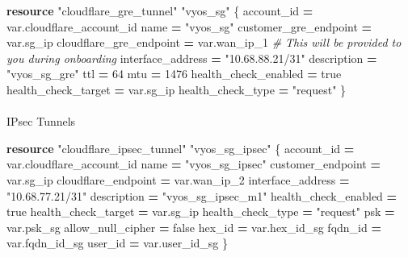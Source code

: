 \documentclass[
]{article}
\makeatletter
\let\oldparagraph\paragraph
\renewcommand{\paragraph}{
    \@ifstar
      \xxxParagraphStar
      \xxxParagraphNoStar
  }
\newcommand{\xxxParagraphStar}[1]{\oldparagraph*{#1}\mbox{}}
\newcommand{\xxxParagraphNoStar}[1]{\oldparagraph{#1}\mbox{}}
\newenvironment{Shaded}{\begin{snugshade}}{\end{snugshade}}
\newcommand{\CommentTok}[1]{\textcolor[rgb]{0.56,0.35,0.01}{\textit{#1}}}
\newcommand{\DecValTok}[1]{\textcolor[rgb]{0.00,0.00,0.81}{#1}}
\newcommand{\KeywordTok}[1]{\textcolor[rgb]{0.13,0.29,0.53}{\textbf{#1}}}
\newcommand{\NormalTok}[1]{#1}
\newcommand{\OperatorTok}[1]{\textcolor[rgb]{0.81,0.36,0.00}{\textbf{#1}}}
\newcommand{\StringTok}[1]{\textcolor[rgb]{0.31,0.60,0.02}{#1}}
\newcommand{\VariableTok}[1]{\textcolor[rgb]{0.00,0.00,0.00}{#1}}
\makeatother
\begin{document}
\begin{Shaded}
\begin{Highlighting}[numbers=left,,]
\KeywordTok{resource} \StringTok{"cloudflare\_gre\_tunnel"} \StringTok{"vyos\_sg"}\NormalTok{ \{}
\NormalTok{  account\_id              }\OperatorTok{=} \VariableTok{var}\NormalTok{.cloudflare\_account\_id}
\NormalTok{  name                    }\OperatorTok{=} \StringTok{"vyos\_sg"}
\NormalTok{  customer\_gre\_endpoint   }\OperatorTok{=} \VariableTok{var}\NormalTok{.sg\_ip}
\NormalTok{  cloudflare\_gre\_endpoint }\OperatorTok{=} \VariableTok{var}\NormalTok{.wan\_ip\_1  }\CommentTok{\# This will be provided to you during onboarding}
\NormalTok{  interface\_address       }\OperatorTok{=} \StringTok{"10.68.88.21/31"}
\NormalTok{  description             }\OperatorTok{=} \StringTok{"vyos\_sg\_gre"}
\NormalTok{  ttl                     }\OperatorTok{=} \DecValTok{64}
\NormalTok{  mtu                     }\OperatorTok{=} \DecValTok{1476}
\NormalTok{  health\_check\_enabled    }\OperatorTok{=} \VariableTok{true}
\NormalTok{  health\_check\_target     }\OperatorTok{=} \VariableTok{var}\NormalTok{.sg\_ip}
\NormalTok{  health\_check\_type       }\OperatorTok{=} \StringTok{"request"}
\NormalTok{\}}
\end{Highlighting}
\end{Shaded}

\paragraph{IPsec Tunnels}\label{ipsec-tunnels}

\begin{Shaded}
\begin{Highlighting}[numbers=left,,]
\KeywordTok{resource} \StringTok{"cloudflare\_ipsec\_tunnel"} \StringTok{"vyos\_sg\_ipsec"}\NormalTok{ \{}
\NormalTok{  account\_id           }\OperatorTok{=} \VariableTok{var}\NormalTok{.cloudflare\_account\_id}
\NormalTok{  name                 }\OperatorTok{=} \StringTok{"vyos\_sg\_ipsec"}
\NormalTok{  customer\_endpoint    }\OperatorTok{=} \VariableTok{var}\NormalTok{.sg\_ip}
\NormalTok{  cloudflare\_endpoint  }\OperatorTok{=} \VariableTok{var}\NormalTok{.wan\_ip\_2}
\NormalTok{  interface\_address    }\OperatorTok{=} \StringTok{"10.68.77.21/31"}
\NormalTok{  description          }\OperatorTok{=} \StringTok{"vyos\_sg\_ipsec\_m1"}
\NormalTok{  health\_check\_enabled }\OperatorTok{=} \VariableTok{true}
\NormalTok{  health\_check\_target  }\OperatorTok{=} \VariableTok{var}\NormalTok{.sg\_ip}
\NormalTok{  health\_check\_type    }\OperatorTok{=} \StringTok{"request"}
\NormalTok{  psk                  }\OperatorTok{=} \VariableTok{var}\NormalTok{.psk\_sg}
\NormalTok{  allow\_null\_cipher    }\OperatorTok{=} \VariableTok{false}
\NormalTok{  hex\_id               }\OperatorTok{=} \VariableTok{var}\NormalTok{.hex\_id\_sg}
\NormalTok{  fqdn\_id              }\OperatorTok{=} \VariableTok{var}\NormalTok{.fqdn\_id\_sg}
\NormalTok{  user\_id              }\OperatorTok{=} \VariableTok{var}\NormalTok{.user\_id\_sg}
\NormalTok{\}}
\end{Highlighting}
\end{Shaded}
\end{document}
